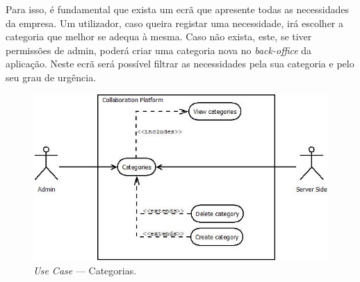 Para isso, é fundamental que exista um ecrã que apresente todas as necessidades da empresa. 
Um utilizador, caso queira registar uma necessidade, irá escolher a categoria que melhor se adequa à mesma. 
Caso não exista, este, se tiver permissões de admin, poderá criar uma categoria nova no \textit{back-office} da aplicação. 
Neste ecrã será possível filtrar as necessidades pela sua categoria e pelo seu grau de urgência.

\begin{figure}[H]
    \centering
    \includegraphics[scale=0.6]{figures/Categories use case.jpeg}
    \caption{\textit{Use Case} --- Categorias.}\label{fig:uc:categories}
\end{figure}

